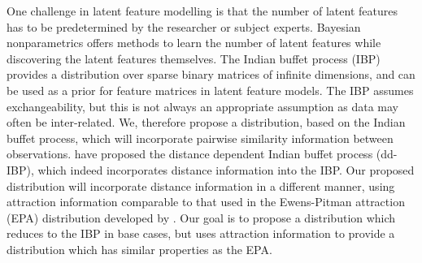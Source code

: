 One challenge in latent feature modelling is that the number of latent features has to be predetermined by the researcher or subject experts. Bayesian nonparametrics offers methods to learn the number of latent features while discovering the latent features themselves. The Indian buffet process (IBP) provides a distribution over sparse binary matrices of infinite dimensions, and can be used as a prior for feature matrices in latent feature models.  The IBP assumes exchangeability, but this is not always an appropriate assumption as data may often be inter-related. We, therefore propose a distribution, based on the Indian buffet process, which will incorporate pairwise similarity information between observations. \cite{ddibp} have proposed the distance dependent Indian buffet process (dd-IBP), which indeed incorporates distance information into the IBP. Our proposed distribution will incorporate distance information in a different manner, using attraction information comparable to that used in the Ewens-Pitman attraction (EPA) distribution developed by \cite{epa}. Our goal is to propose a distribution which reduces to the IBP in base cases, but uses attraction information to provide a distribution which has similar properties as the EPA.
